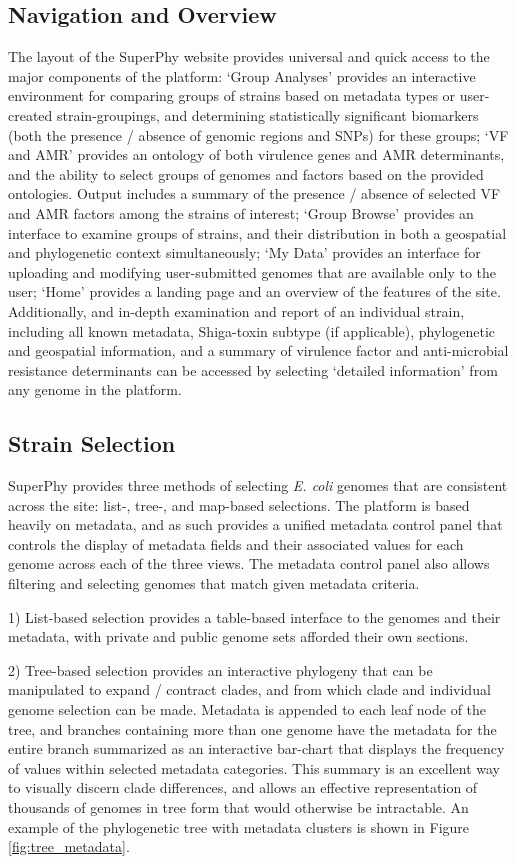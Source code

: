 \documentclass[doublespacing, linenumbers]{bmcart}
\begin{document}
\subsection{Navigation and Overview}
The layout of the SuperPhy website provides universal and quick access to the major components of the platform: `Group Analyses' provides an interactive environment for comparing groups of strains based on metadata types or user-created strain-groupings, and determining statistically significant biomarkers (both the presence / absence of genomic regions and SNPs) for these groups; `VF and AMR' provides an ontology of both virulence genes and AMR determinants, and the ability to select groups of genomes and factors based on the provided ontologies. Output includes a summary of the presence / absence of selected VF and AMR factors among the strains of interest; `Group Browse' provides an interface to examine groups of strains, and their distribution in both a geospatial and phylogenetic context simultaneously; `My Data' provides an interface for uploading and modifying user-submitted genomes that are available only to the user; `Home' provides a landing page and an overview of the features of the site.  Additionally, and in-depth examination and report of an individual strain, including all known metadata, Shiga-toxin subtype (if applicable), phylogenetic and geospatial information, and a summary of virulence factor and anti-microbial resistance determinants can be accessed by selecting `detailed information' from any genome in the platform.

\subsection{Strain Selection}
SuperPhy provides three methods of selecting \textit{E. coli} genomes that are consistent across the site: list-, tree-, and map-based selections. The platform is based heavily on metadata, and as such provides a unified metadata control panel that controls the display of metadata fields and their associated values for each genome across each of the three views. The metadata control panel also allows filtering and selecting genomes that match given metadata criteria.

 1) List-based selection provides a table-based interface to the genomes and their metadata, with private and public genome sets afforded their own sections.

 2) Tree-based selection provides an interactive  phylogeny that can be manipulated to expand / contract clades, and from which clade and individual genome selection can be made. Metadata is appended to each leaf node of the tree, and branches containing more than one genome have the metadata for the entire branch summarized as an interactive bar-chart that displays the frequency of values within selected metadata categories. This summary is an excellent way to visually discern clade differences, and allows an effective representation of thousands of genomes in tree form that would otherwise be intractable. An example of the phylogenetic tree with metadata clusters is shown in Figure \ref{fig:tree_metadata}.
\end{document}
